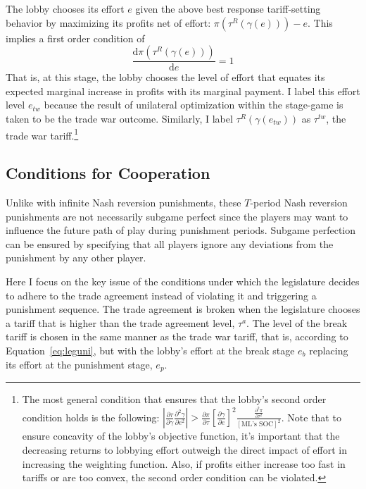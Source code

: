 \documentclass[authoryear, review]{elsarticle}
\newcommand{\ga}{\gamma}
\begin{document}
The lobby chooses its effort $e$ given the above best response tariff-setting behavior by maximizing its profits net of effort: $\pi\left(\tau^R\left(\ga\left(e\right)\right)\right) - e$. This implies a first order condition of
\begin{equation}
	\frac{\mathrm{d} \pi(\tau^R(\ga(e)))}{\mathrm{d} e} = 1
  \label{eq:lobtw}
\end{equation}
That is, at this stage, the lobby chooses the level of effort that equates its expected marginal increase in profits with its marginal payment. I label this effort level $e_{tw}$ because the result of unilateral optimization within the stage-game is taken to be the trade war outcome. Similarly, I label $\tau^R(\ga(e_{tw}))$ as $\tau^{tw}$, the trade war tariff.\footnote{The most general condition that ensures that the lobby's second order condition holds is the following: $\left| \frac{\partial \tau}{\partial \ga}\frac{\partial^2 \ga}{\partial e^2}\right|>\frac{\partial \pi}{\partial \tau}\left[\frac{\partial \ga}{\partial e}\right]^2\frac{\frac{\partial^2 \pi}{\partial \tau^2}}{\left[\text{ML's SOC}\right]^2}$. Note that to ensure concavity of the lobby's objective function, it's important that the decreasing returns to lobbying effort outweigh the direct impact of effort in increasing the weighting function. Also, if profits either increase too fast in tariffs or are too convex, the second order condition can be violated.\label{fn:lobsoc}}

\subsection{Conditions for Cooperation}
Unlike with infinite Nash reversion punishments, these $T$-period Nash reversion punishments are not necessarily subgame perfect since the players may want to influence the future path of play during punishment periods. Subgame perfection can be ensured by specifying that all players ignore any deviations from the punishment by any other player.

Here I focus on the key issue of the conditions under which the legislature decides to adhere to the trade agreement instead of violating it and triggering a punishment sequence. The trade agreement is broken when the legislature chooses a tariff that is higher than the trade agreement level, $\tau^a$. The level of the break tariff is chosen in the same manner as the trade war tariff, that is, according to Equation~\ref{eq:leguni}, but with the lobby's effort at the break stage $e_b$ replacing its effort at the punishment stage, $e_p$.
\end{document}
